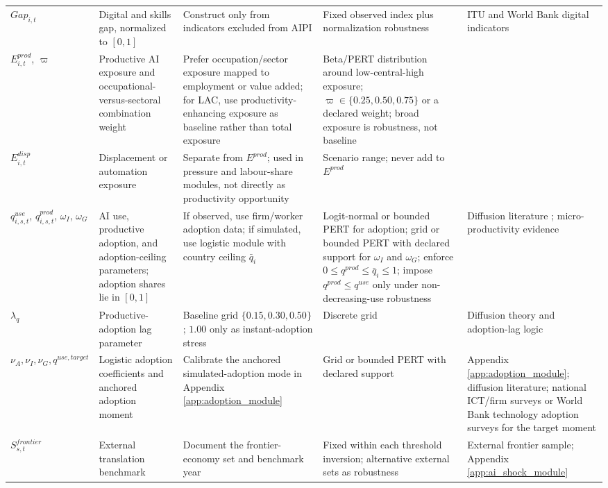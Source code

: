 \documentclass[11pt,a4paper]{article}
\begin{document}
\begin{longtable}{p{}p{}p{}p{}p{}}
$Gap_{i,t}$ & Digital and skills gap, normalized to $[0,1]$ & Construct only from indicators excluded from AIPI & Fixed observed index plus normalization robustness & ITU and World Bank digital indicators \\
$E^{prod}_{i,t}$, $\varpi$ & Productive AI exposure and occupational-versus-sectoral combination weight & Prefer occupation/sector exposure mapped to employment or value added; for LAC, use productivity-enhancing exposure as baseline rather than total exposure & Beta/PERT distribution around low-central-high exposure; $\varpi\in\{0.25,0.50,0.75\}$ or a declared weight; broad exposure is robustness, not baseline & \citet{worldbankilo2024lacgenai,cazzaniga2024genai} \\
$E^{disp}_{i,t}$ & Displacement or automation exposure & Separate from $E^{prod}$; used in pressure and labour-share modules, not directly as productivity opportunity & Scenario range; never add to $E^{prod}$ & \citet{worldbankilo2024lacgenai,cazzaniga2024genai} \\
$q^{use}_{i,s,t}$, $q^{prod}_{i,s,t}$, $\omega_I$, $\omega_G$ & AI use, productive adoption, and adoption-ceiling parameters; adoption shares lie in $[0,1]$ & If observed, use firm/worker adoption data; if simulated, use logistic module with country ceiling $\bar q_i$ & Logit-normal or bounded PERT for adoption; grid or bounded PERT with declared support for $\omega_I$ and $\omega_G$; enforce $0\le q^{prod}\le\bar q_i\le1$; impose $q^{prod}\le q^{use}$ only under non-decreasing-use robustness & Diffusion literature \citep{bass1969newproduct,rogers2003diffusion}; micro-productivity evidence \citep{noy2023experimental,brynjolfsson2023generative} \\
$\lambda_q$ & Productive-adoption lag parameter & Baseline grid $\{0.15,0.30,0.50\}$; $1.00$ only as instant-adoption stress & Discrete grid & Diffusion theory and adoption-lag logic \\
$\nu_A,\nu_I,\nu_G,q^{use,target}$ & Logistic adoption coefficients and anchored adoption moment & Calibrate the anchored simulated-adoption mode in Appendix \ref{app:adoption_module} & Grid or bounded PERT with declared support & Appendix \ref{app:adoption_module}; diffusion literature; national ICT/firm surveys or World Bank technology adoption surveys for the target moment \\
$S^{frontier}_{s,t}$ & External translation benchmark & Document the frontier-economy set and benchmark year & Fixed within each threshold inversion; alternative external sets as robustness & External frontier sample; Appendix \ref{app:ai_shock_module} \\

\end{longtable}
\end{document}
